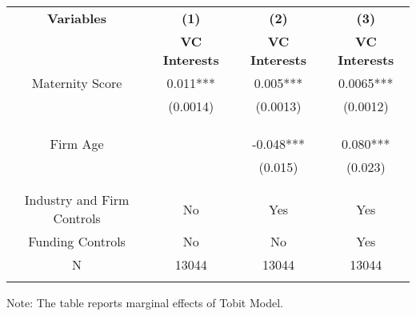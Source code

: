  \begin{table}[htbp]
    \begin{tabular}{c c c c}
    \toprule
    \textbf{Variables} & \textbf{(1)} & \textbf{(2)} & \textbf{(3)}               \\ 
    \textbf & \textbf{VC Interests} & \textbf{VC Interests} & \textbf{VC Interests}  \\ 

    \midrule
    Maternity Score     &    0.011*** &      0.005***    &    0.0065***   \\
                        &    (0.0014)  &      (0.0013)   &   (0.0012)  \\
                        &             &                  &               \\

                        &             &                  &               \\
                        &             &                  &          \\
    Firm Age            &             &      -0.048***   &    0.080***        \\
                        &             &      (0.015)     &   (0.023)       \\
                        &             &                  &               \\
                        &             &                  &            \\

Industry and Firm Controls   &   No        &   Yes       &        Yes    \\
    Funding Controls    &   No             &   No        &       Yes        \\

    \midrule
     N                  &   13044          &      13044  &      13044      \\          
    \bottomrule
    \addlinespace[1ex]
    \multicolumn{3}{l}{\textsuperscript{***}$p<0.01$, 
      \textsuperscript{**}$p<0.05$, 
      \textsuperscript{*}$p<0.1$}
    \end{tabular}
    Note: The table reports marginal effects of Tobit Model.
\end{table}
